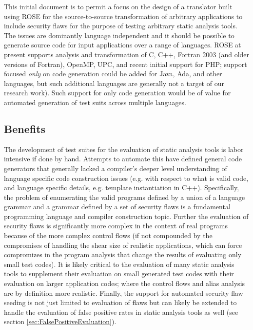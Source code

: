    This initial document is to permit a focus on the design of
a translator built using ROSE for the source-to-source transformation
of arbitrary applications to include security flaws for the purpose
of testing arbitrary static analysis tools.  The issues are dominantly
language independent and it should be possible to generate source
code for input applications over a range of languages.  ROSE at present supports
analysis and transformation of C, C++, Fortran 2003 (and older versions of Fortran), 
OpenMP, UPC, and recent initial support for PHP; support focused {\em only} on code
generation could be added for Java, Ada, and other languages, but such additional
languages are generally not a target of our research work). Such support for only code
generation would be of value for automated generation of test suits across multiple
languages.

\subsection{Benefits}
   The development of test suites for the evaluation of static analysis tools
is labor intensive if done by hand.  Attempts to automate this have defined general code
generators that generally lacked a compiler's deeper level understanding of 
language specific code construction issues (e.g. with respect to what is valid code,
and language specific details, e.g. template instantiation in C++).
Specifically, the problem of enumerating
the valid programs defined by a union of a language grammar and a grammar defined by 
a set of security flaws is a fundamental programming language and compiler construction
topic.  Further the evaluation of security flaws is significantly more complex in the
context of real programs because of the more complex control flows (if not compounded by
the compromises of handling the shear size of realistic applications, which can force 
compromizes in the program analysis that change the results of evaluating only small 
test codes).  It is likely
critical to the evaluation of many static analysis tools to supplement their evaluation on
small generated test codes with their evaluation on larger application codes; where
the control flows and alias analysis are by definition more realistic.  Finally, the
support for automated security flaw seeding is not just limited to evaluation of flaws but
can likely be extended to handle the evaluation of false positive rates in static analysis
tools as well (see section \ref{sec:FalsePositiveEvaluation}).

